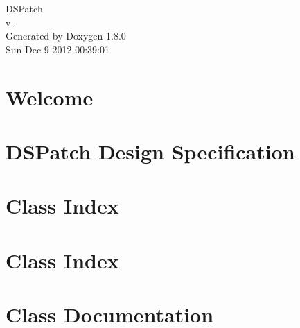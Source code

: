 \documentclass{book}
\begin{document}
\begin{titlepage}
\vspace*{7cm}
\begin{center}
{\Large D\-S\-Patch \\[1ex]\large v.. }\\
\vspace*{1cm}
{\large Generated by Doxygen 1.8.0}\\
\vspace*{0.5cm}
{\small Sun Dec 9 2012 00:39:01}\\
\end{center}
\end{titlepage}
\clearemptydoublepage
{}
\tableofcontents
\clearemptydoublepage
{}
\chapter{Welcome}
\label{index}
\chapter{D\-S\-Patch Design Specification}
\label{spec_page}

\chapter{Class Index}

\chapter{Class Index}

\chapter{Class Documentation}












\printindex
\end{document}
